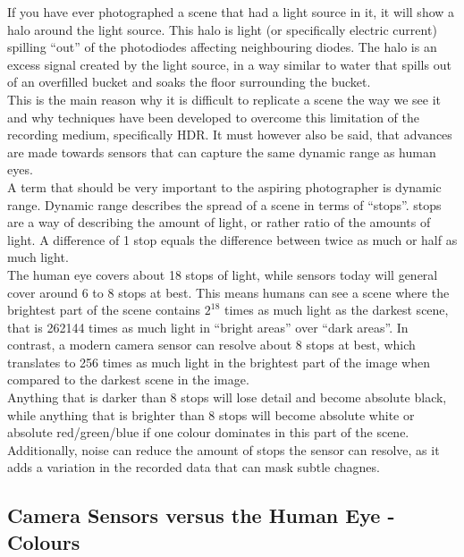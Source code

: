 If you have ever photographed a scene that had a light source in it, it will show a halo around the light source. This halo is light (or specifically electric current) spilling ``out'' of the photodiodes affecting neighbouring diodes. The halo is an excess signal created by the light source, in a way similar to water that spills out of an overfilled bucket and soaks the floor surrounding the bucket.
\\[\baselineskip]
This is the main reason why it is difficult to replicate a scene the way we see it and why techniques have been developed to overcome this limitation of the recording medium, specifically \gls{HDR}. It must however also be said, that advances are made towards \glspl{sensor} that can capture the same dynamic range as human eyes.
\\[\baselineskip]
A term that should be very important to the aspiring photographer is dynamic range. Dynamic range describes the spread of a scene in terms of ``\glspl{stop}''. \Glspl{stop} are a way of describing the amount of light, or rather ratio of the amounts of light. A difference of 1 stop equals the difference between twice as much or half as much light.
\\
The human eye covers about 18 \glspl{stop} of light, while \glspl{sensor} today will general cover around 6 to 8 \glspl{stop} at best. This means humans can see a scene where the brightest part of the scene contains $2^{18}$ times as much light as the darkest scene, that is 262144 times as much light in ``bright areas'' over ``dark areas''. In contrast, a modern camera sensor can resolve about 8 \glspl{stop} at best, which translates to 256 times as much light in the brightest part of the image when compared to the darkest scene in the image.
\\
Anything that is darker than 8 \glspl{stop} will lose detail and become absolute black, while anything that is brighter than 8 \glspl{stop} will become absolute white or absolute red/green/blue if one colour dominates in this part of the scene.
\\
Additionally, noise can reduce the amount of \glspl{stop} the sensor can resolve, as it adds a variation in the recorded data that can mask subtle chagnes.


\subsection{Camera Sensors versus the Human Eye - Colours}

